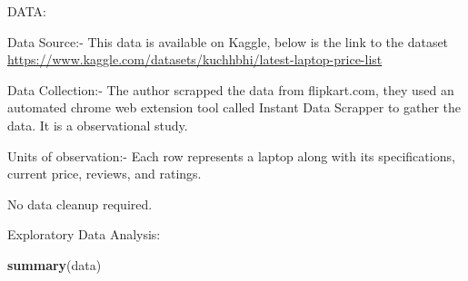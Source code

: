 \documentclass[
]{article}
\newenvironment{Shaded}{\begin{snugshade}}{\end{snugshade}}
\newcommand{\FunctionTok}[1]{\textcolor[rgb]{0.13,0.29,0.53}{\textbf{#1}}}
\newcommand{\NormalTok}[1]{#1}
\begin{document}
DATA:

Data Source:- This data is available on Kaggle, below is the link to the
dataset
\url{https://www.kaggle.com/datasets/kuchhbhi/latest-laptop-price-list}

Data Collection:- The author scrapped the data from flipkart.com, they
used an automated chrome web extension tool called Instant Data Scrapper
to gather the data. It is a observational study.

Units of observation:- Each row represents a laptop along with its
specifications, current price, reviews, and ratings.

No data cleanup required.

Exploratory Data Analysis:

\begin{Shaded}
\begin{Highlighting}[]
\FunctionTok{summary}\NormalTok{(data)}
\end{Highlighting}
\end{Shaded}
\end{document}

